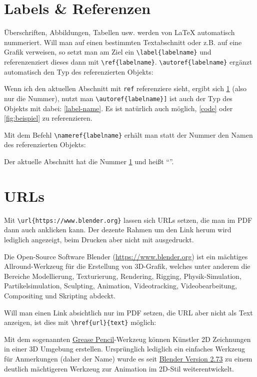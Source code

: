 	\section{Labels \& Referenzen}\label{label-name}
		Überschriften, Abbildungen, Tabellen usw. werden von \LaTeX{} automatisch nummeriert.
%		
		Will man auf einen bestimmten Textabschnitt oder z.B. auf eine Grafik verweisen, so setzt man am Ziel ein \lstinline|\label{labelname}| und referenzenziert dieses dann mit \lstinline|\ref{labelname}|. \lstinline|\autoref{labelname}| ergänzt automatisch den Typ des referenzierten Objekts:
%		
		\begin{vorlagenbeispiel}
		Wenn ich den aktuellen Abschnitt mit \lstinline|ref| referenziere sieht, ergibt sich \ref{label-name} (also nur die Nummer), nutzt man \lstinline|\autoref{labelname}]| ist auch der Typ des Objekts mit dabei: \autoref{label-name}.
%		
		Es ist natürlich auch möglich, \autoref{code} oder \autoref{fig:beispiel} zu referenzieren.
		\end{vorlagenbeispiel}
		
		Mit dem Befehl \lstinline|\nameref{labelname}| erhält man statt der Nummer den Namen des referenzierten Objekts:
		\begin{vorlagenbeispiel}
			Der aktuelle Abschnitt hat die Nummer \ref{label-name} und heißt \enquote{}.
		\end{vorlagenbeispiel}
			
	\section{URLs}
		Mit \lstinline[language=thesis-latexbeispiel]|\url{https://www.blender.org}| lassen sich URLs setzen, die man im PDF dann auch anklicken kann. Der dezente Rahmen um den Link herum wird lediglich angezeigt, beim Drucken aber nicht mit ausgedruckt.
		
		\begin{vorlagenbeispiel}
			Die Open-Source Software Blender (\url{https://www.blender.org}) ist ein mächtiges Allround-Werkzeug für die Erstellung von 3D-Grafik, welches unter anderem die Bereiche Modellierung, Texturierung, Rendering, Rigging, Physik-Simulation, Partikelsimulation, Sculpting, Animation, Videotracking, Videobearbeitung, Compositing und Skripting abdeckt.
		\end{vorlagenbeispiel}
		\medskip

		Will man einen Link absichtlich nur im PDF setzen, die URL aber nicht als Text anzeigen, ist dies mit \lstinline[language=thesis-latexbeispiel]|\href{url}{text}| möglich:
%		
		\begin{vorlagenbeispiel}
			Mit dem sogenannten \href{https://www.blender.org/features/grease-pencil/}{Grease Pencil}-Werkzeug können Künstler 2D Zeichnungen in einer 3D Umgebung erstellen.
			Ursprünglich lediglich ein einfaches Werkzeug für Anmerkungen (daher der Name) wurde es seit \href{https://www.blender.org/download/releases/2-73/}{Blender Version 2.73} zu einem deutlich mächtigeren Werkzeug zur Animation im 2D-Stil weiterentwickelt.
		\end{vorlagenbeispiel}		
		
